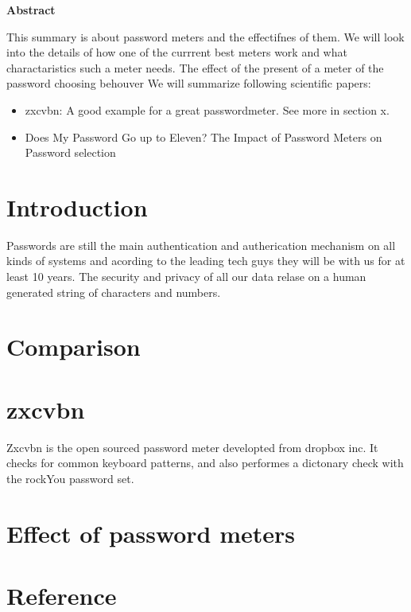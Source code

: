 \documentclass[12pt,a4paper]{article}
\author{Schwarenthorer Yannick}
\begin{document}
\textbf{Abstract} 

This summary is about password meters and the effectifnes of them. 
We will look into the details of how one of the currrent best meters work and what charactaristics such a meter needs.
The effect of the present of a meter of the password choosing behouver 
We will summarize following scientific papers:

\begin{itemize}
  \item zxcvbn: A good example for a great passwordmeter. See more in section x.
  \item Does My Password Go up to Eleven? The Impact of Password Meters on Password selection
\end{itemize}

\section{Introduction}
\label{sec:introduction}
Passwords are still the main authentication and autherication mechanism on all kinds of systems and acording to the leading tech guys they will be with us for at least 10 years.
The security and privacy of all our data relase on a human generated string of characters and numbers.



\section{Comparison}
\label{sec:Comparison}



\section{zxcvbn}
\label{sec:zxcvbn}
Zxcvbn is the open sourced password meter developted from dropbox inc. It checks for common keyboard patterns, and also performes a dictonary check with the rockYou password set.


\section{Effect of password meters}
\label{sec:effect}



\section{Reference}
\label{sec:referemce}
\end{document}
